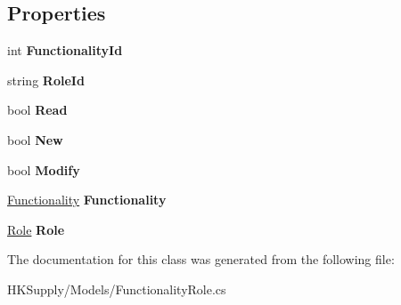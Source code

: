 \subsection*{Properties}
\begin{DoxyCompactItemize}
\item 
\mbox{\label{class_h_k_supply_1_1_models_1_1_functionality_role_a0ded12aa8bec42c6b7bb6097c74c35e7}} 
int {\bfseries Functionality\+Id}
\item 
\mbox{\label{class_h_k_supply_1_1_models_1_1_functionality_role_a765b8678a9661752e6f2899d98e661d4}} 
string {\bfseries Role\+Id}
\item 
\mbox{\label{class_h_k_supply_1_1_models_1_1_functionality_role_aed71c97ac0caf396dc15a24c45d56fab}} 
bool {\bfseries Read}
\item 
\mbox{\label{class_h_k_supply_1_1_models_1_1_functionality_role_a6faad04d06f87ef7121acb504c3c6759}} 
bool {\bfseries New}
\item 
\mbox{\label{class_h_k_supply_1_1_models_1_1_functionality_role_a26b7d361ba1ab93b2f393b1b99e5fc39}} 
bool {\bfseries Modify}
\item 
\mbox{\label{class_h_k_supply_1_1_models_1_1_functionality_role_ae6697fdcf6d2cdcbcf86736b5abbc3ae}} 
\mbox{\hyperlink{class_h_k_supply_1_1_models_1_1_functionality}{Functionality}} {\bfseries Functionality}
\item 
\mbox{\label{class_h_k_supply_1_1_models_1_1_functionality_role_a94917c7d388484877ef08df62449f747}} 
\mbox{\hyperlink{class_h_k_supply_1_1_models_1_1_role}{Role}} {\bfseries Role}
\end{DoxyCompactItemize}


The documentation for this class was generated from the following file\+:\begin{DoxyCompactItemize}
\item 
H\+K\+Supply/\+Models/Functionality\+Role.\+cs\end{DoxyCompactItemize}
